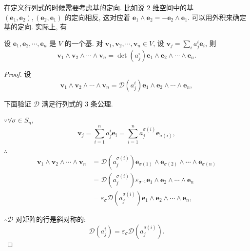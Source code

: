 \documentclass[color=black,device=normal,lang=cn,mode=geye]{elegantnote}
\begin{document}
在定义行列式的时候需要考虑基的定向. 比如说 $2$ 维空间中的基 $(\boldsymbol{e}_1,\boldsymbol{e}_2),(\boldsymbol{e}_2,\boldsymbol{e}_1)$ 的定向相反, 这对应着 $\boldsymbol{e}_1\land\boldsymbol{e}_2=-\boldsymbol{e}_2\land\boldsymbol{e}_1$. 可以用外积来确定基的定向. 实际上, 有
\begin{theorem}[书上的定理 5]\label{t4.3}
    设 $\boldsymbol{e}_1,\boldsymbol{e}_2,\cdots,\boldsymbol{e}_n$ 是 $V$ 的一个基. 对 $\boldsymbol{v}_1,\boldsymbol{v}_2,\cdots,\boldsymbol{v}_n\in V$, 设 $\boldsymbol{v}_j=\sum\limits_{i}a_j^i\boldsymbol{e}_i$, 则
    \[\boldsymbol{v}_1\wedge\boldsymbol{v}_2\wedge\cdots\wedge\boldsymbol{v}_n=\operatorname{det}(a_j^i)\boldsymbol{e}_1\wedge\boldsymbol{e}_2\wedge\cdots\wedge\boldsymbol{e}_n.\]
\end{theorem}
\begin{proof}
    设
    \[\boldsymbol{v}_1\wedge\boldsymbol{v}_2\wedge\cdots\wedge\boldsymbol{v}_n=\mathcal{D}(a_j^i)\boldsymbol{e}_1\wedge\boldsymbol{e}_2\wedge\cdots\wedge\boldsymbol{e}_n,\]

    下面验证 $\mathcal{D}$ 满足行列式的 3 条公理.

    $\because\forall\sigma\in S_n$,
    \[\boldsymbol{v}_j=\sum\limits_{i=1}^na_j^i\boldsymbol{e}_i=\sum\limits_{i=1}^na_j^{\sigma(i)}\boldsymbol{e}_{\sigma(i)},\]

    $\therefore$
    \begin{align*}
        \boldsymbol{v}_1\wedge\boldsymbol{v}_2\wedge\cdots\wedge\boldsymbol{v}_n & =\mathcal{D}(a_j^{\sigma(i)})\boldsymbol{e}_{\sigma(1)}\wedge\boldsymbol{e}_{\sigma(2)}\wedge\cdots\wedge\boldsymbol{e}_{\sigma(n)} \\
        & =\mathcal{D}(a_j^{\sigma(i)})\varepsilon_{\sigma^{-1}}\boldsymbol{e}_1\wedge\boldsymbol{e}_2\wedge\cdots\wedge\boldsymbol{e}_n \\
        & =\varepsilon_{\sigma}\mathcal{D}(a_j^{\sigma(i)})\boldsymbol{e}_1\wedge\boldsymbol{e}_2\wedge\cdots\wedge\boldsymbol{e}_n,
    \end{align*}

    $\therefore\mathcal{D}$ 对矩阵的行是斜对称的:
    \[\mathcal{D}(a_j^i)=\varepsilon_{\sigma}\mathcal{D}(a_j^{\sigma(i)}).\]


\end{proof}
\end{document}
